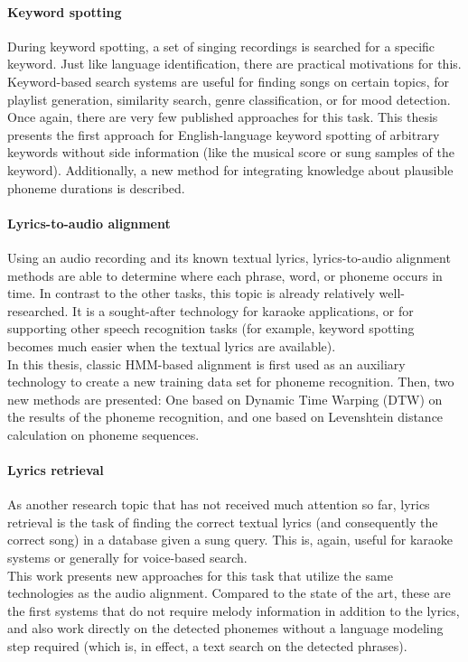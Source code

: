 \paragraph{Keyword spotting}
During keyword spotting, a set of singing recordings is searched for a specific keyword. Just like language identification, there are practical motivations for this. Keyword-based search systems are useful for finding songs on certain topics, for playlist generation, similarity search, genre classification, or for mood detection.\\
Once again, there are very few published approaches for this task. This thesis presents the first approach for English-language keyword spotting of arbitrary keywords without side information (like the musical score or sung samples of the keyword). Additionally, a new method for integrating knowledge about plausible phoneme durations is described.

\paragraph{Lyrics-to-audio alignment}
Using an audio recording and its known textual lyrics, lyrics-to-audio alignment methods are able to determine where each phrase, word, or phoneme occurs in time. In contrast to the other tasks, this topic is already relatively well-researched. It is a sought-after technology for karaoke applications, or for supporting other speech recognition tasks (for example, keyword spotting becomes much easier when the textual lyrics are available).\\
In this thesis, classic HMM-based alignment is first used as an auxiliary technology to create a new training data set for phoneme recognition. Then, two new methods are presented: One based on Dynamic Time Warping (DTW) on the results of the phoneme recognition, and one based on Levenshtein distance calculation on phoneme sequences.

\paragraph{Lyrics retrieval}
As another research topic that has not received much attention so far, lyrics retrieval is the task of finding the correct textual lyrics (and consequently the correct song) in a database given a sung query. This is, again, useful for karaoke systems or generally for voice-based search.\\
This work presents new approaches for this task that utilize the same technologies as the audio alignment. Compared to the state of the art, these are the first systems that do not require melody information in addition to the lyrics, and also work directly on the detected phonemes without a language modeling step required (which is, in effect, a text search on the detected phrases).


